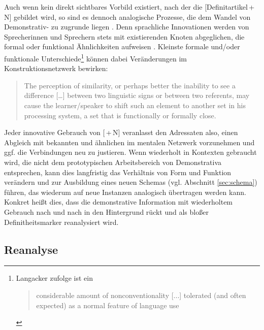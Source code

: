 Auch wenn kein direkt sichtbares Vorbild existiert, nach der die   [Definitartikel\,+\,N] gebildet wird, so sind es dennoch analogische   Prozesse, die dem  Wandel von Demonstrativ-  zu  zugrunde liegen \parencite[eine ähnliche Perspektive nimmt auch Sommerer bei der Entwicklung des engl. Definitartikels ein, s.][]{Sommerer2011}. Denn sprachliche Innovationen werden von Sprecherinnen und Sprechern stets mit existierenden Knoten abgeglichen, die formal oder funktional Ähnlichkeiten aufweisen \parencite[51]{Traugott2013}. Kleinste formale und/oder funktionale Unterschiede\footnote{Langacker zufolge ist ein \blockcquote[69]{Langacker1987}{considerable amount of nonconventionality [...] tolerated (and often expected) as a normal feature of language use}.}
 können dabei Veränderungen im Konstruktionsnetzwerk bewirken:  \blockcquote[324]{Fischer2007} {The perception of similarity, or perhaps better the inability to see a difference […] between two linguistic signs or between two referents, may cause the learner/speaker to shift such an element to another set in his processing system, a set that is functionally or formally close.} Jeder innovative Gebrauch von [\,+\,N] veranlasst den Adressaten also, einen Abgleich mit bekannten und ähnlichen  \parencite[60]{Bybee2010} im mentalen Netzwerk vorzunehmen und ggf. die Verbindungen neu zu justieren. Wenn  wiederholt in Kontexten gebraucht wird, die nicht dem prototypischen Arbeitsbereich von Demonstrativa  entsprechen, kann dies langfristig das Verhältnis von Form und Funktion verändern und zur Ausbildung eines neuen Schemas (vgl. Abschnitt \ref{sec:schema}) führen, das wiederum auf neue Instanzen analogisch  übertragen werden kann. Konkret heißt dies, dass die demonstrative Information mit wiederholtem Gebrauch nach und nach in den Hintergrund rückt und  als bloßer Definitheitsmarker  reanalysiert  wird.

\subsection{Reanalyse}\label{sec:reanalyse}

